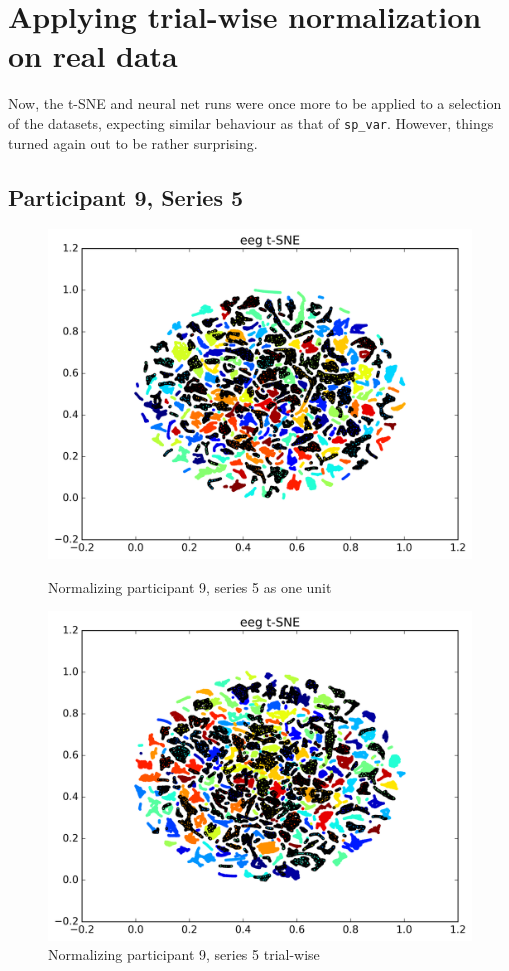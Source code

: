 \documentclass{article} %
\begin{document}
\section{Applying trial-wise normalization on real data}
Now, the t-SNE and neural net runs were once more to be applied to a selection of the datasets, expecting similar behaviour as that of \verb|sp_var|. However, things turned again out to be rather surprising.

\subsection{Participant 9, Series 5}
\begin{figure}
	\centering
	\begin{minipage}{0.5\textwidth}
		\centering
		\includegraphics[width=1.0\textwidth]{P9S5u.png}
		\caption{Normalizing participant 9, series 5 as one unit}
		\label{fig:P9S5u}
	\end{minipage}\hfill
	\begin{minipage}{0.5\textwidth}
		\centering
		\includegraphics[width=1.0\textwidth]{P9S5t.png}
		\caption{Normalizing participant 9, series 5 trial-wise}
		\label{fig:P9S5t}
	\end{minipage}
\end{figure}
\end{document}
